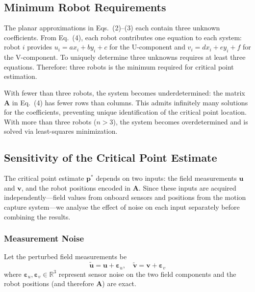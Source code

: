 \documentclass[lettersize,journal]{IEEEtran}
\begin{document}
\subsection{Minimum Robot Requirements}

The planar approximations in Eqs.~(2)--(3) each contain three unknown coefficients. From Eq.~(4), each robot contributes one equation to each system: robot $i$ provides $u_i = ax_i + by_i + c$ for the U-component and $v_i = dx_i + ey_i + f$ for the V-component. To uniquely determine three unknowns requires at least three equations. Therefore: three robots is the minimum required for critical point estimation.

With fewer than three robots, the system becomes underdetermined: the matrix $\mathbf{A}$ in Eq.~(4) has fewer rows than columns. This admits infinitely many solutions for the coefficients, preventing unique identification of the critical point location. With more than three robots ($n > 3$), the system becomes overdetermined and is solved via least-squares minimization.


\subsection{Sensitivity of the Critical Point Estimate}

The critical point estimate $\mathbf{p}^*$ depends on two inputs: the field measurements $\mathbf{u}$ and $\mathbf{v}$, and the robot positions encoded in $\mathbf{A}$. Since these inputs are acquired independently---field values from onboard sensors and positions from the motion capture system---we analyse the effect of noise on each input separately before combining the results.

\subsubsection{Measurement Noise}

Let the perturbed field measurements be
\begin{equation}
    \tilde{\mathbf{u}} = \mathbf{u} + \boldsymbol{\varepsilon}_u, \quad \tilde{\mathbf{v}} = \mathbf{v} + \boldsymbol{\varepsilon}_v
\end{equation}
where $\boldsymbol{\varepsilon}_u, \boldsymbol{\varepsilon}_v \in \mathbb{R}^3$ represent sensor noise on the two field components and the robot positions (and therefore $\mathbf{A}$) are exact.
\end{document}

